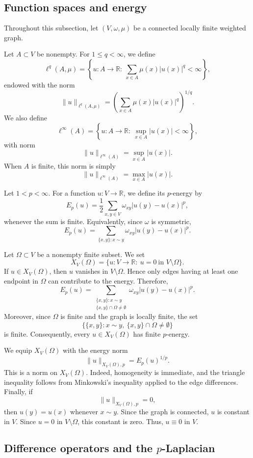 \documentclass[twoside,12pt,letter]{article}
\theoremstyle{plain}
\theoremstyle{definition}
\theoremstyle{remark}
\numberwithin{equation}{section}
\begin{document}
\subsection{Function spaces and energy}

Throughout this subsection, let \((V,\omega,\mu)\) be a connected locally finite
weighted graph.

Let \(A\subset V\) be nonempty. For \(1\le q<\infty\), we define
\[
\ell^q(A,\mu)
=
\left\{
u:A\to\mathbb{R}:\ 
\sum_{x\in A}\mu(x)|u(x)|^q<\infty
\right\},
\]
endowed with the norm
\[
\|u\|_{\ell^q(A,\mu)}
=
\left(\sum_{x\in A}\mu(x)|u(x)|^q\right)^{1/q}.
\]
We also define
\[
\ell^\infty(A)
=
\left\{
u:A\to\mathbb{R}:\ \sup_{x\in A}|u(x)|<\infty
\right\},
\]
with norm
\[
\|u\|_{\ell^\infty(A)}
=
\sup_{x\in A}|u(x)|.
\]
When \(A\) is finite, this norm is simply
\[
\|u\|_{\ell^\infty(A)}
=
\max_{x\in A}|u(x)|.
\]

Let \(1<p<\infty\). For a function \(u:V\to\mathbb{R}\), we define its
\(p\)-energy by
\[
E_p(u)
=
\frac12\sum_{x,y\in V}\omega_{xy}|u(y)-u(x)|^p,
\]
whenever the sum is finite. Equivalently, since \(\omega\) is symmetric,
\[
E_p(u)
=
\sum_{\{x,y\}:x\sim y}\omega_{xy}|u(y)-u(x)|^p.
\]

Let \(\Omega\subset V\) be a nonempty finite subset. We set
\[
X_V(\Omega)
=
\{u:V\to\mathbb{R}:\ u=0\ \text{in }V\setminus\Omega\}.
\]
If \(u\in X_V(\Omega)\), then \(u\) vanishes in \(V\setminus\Omega\). Hence
only edges having at least one endpoint in \(\Omega\) can contribute to the
energy. Therefore,
\[
E_p(u)
=
\sum_{\substack{\{x,y\}:x\sim y\\ \{x,y\}\cap\Omega\neq\emptyset}}
\omega_{xy}|u(y)-u(x)|^p.
\]
Moreover, since \(\Omega\) is finite and the graph is locally finite, the set
\[
\bigl\{\{x,y\}:x\sim y,\ \{x,y\}\cap\Omega\neq\emptyset\bigr\}
\]
is finite. Consequently, every \(u\in X_V(\Omega)\) has finite \(p\)-energy.

We equip \(X_V(\Omega)\) with the energy norm
\[
\|u\|_{X_V(\Omega),p}=E_p(u)^{1/p}.
\]
This is a norm on \(X_V(\Omega)\). Indeed, homogeneity is immediate, and the
triangle inequality follows from Minkowski's inequality applied to the edge
differences. Finally, if
\[
\|u\|_{X_V(\Omega),p}=0,
\]
then \(u(y)=u(x)\) whenever \(x\sim y\). Since the graph is connected, \(u\) is
constant in \(V\). Since \(u=0\) in \(V\setminus\Omega\), this constant is zero.
Thus, \(u\equiv 0\) in \(V\).

\subsection{Difference operators and the \(p\)-Laplacian}
\end{document}
